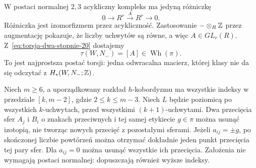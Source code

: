 W postaci normalnej $2,3$ acykliczny kompleks ma
jedyną różniczkę
\[
 0\longrightarrow R^r\xrightarrow{\ A\ }R^r
 \longrightarrow0.
\]
Różniczka jest izomorfizmem przez acykliczność.
Zastosowanie $-\otimes_R\mathbb{Z}$ przez augmentację pokazuje,
że liczby uchwytów są równe, a więc $A\in GL_r(R)$.
Z~\eqref{eq:torsja-dwa-stopnie-20} dostajemy
\begin{equation}\label{eq:torsja-macierz-20}
             \tau(W,N_-)=[A]\in\operatorname{Wh}(\pi).
\end{equation}
To jest najprostsza postać torsji: jedna odwracalna
macierz, której klasy nie da się odczytać z
$H_*(W,N_-;\mathbb{Z})$.

\begin{lemat}
\label{lem:whitney-pi-20}
Niech $m\geq6$, a uporządkowany rozkład $h$-kobordyzmu
ma wszystkie indeksy w przedziale $[k,m-2]$,
gdzie $2\leq k\leq m-3$. Niech $L$ będzie poziomicą
po wszystkich $k$-uchwytach, przed wszystkimi
$(k+1)$-uchwytami. Dwa przecięcia sfer
$A_j$ i $B_i$ o znakach przeciwnych i tej samej
etykiecie $g\in\pi$ można usunąć izotopią,
nie tworząc nowych przecięć z pozostałymi sferami.
Jeżeli $a_{ij}=\pm g$, po skończonej liczbie
powtórzeń można otrzymać dokładnie jeden
punkt przecięcia tej pary sfer. Dla $a_{ij}=0$ można
usunąć wszystkie ich przecięcia. Założenia nie wymagają
postaci normalnej: dopuszczają również wyższe indeksy.
\end{lemat}
